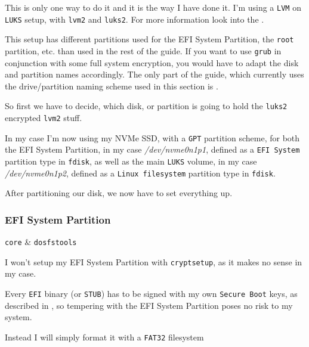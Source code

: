 \documentclass[10pt]{dustdoc}
\begin{document}
\begin{NOTE}
    This is only one way to do it and it is the way I have done it.
    I’m using a \texttt{LVM} on \texttt{LUKS} setup, with \texttt{lvm2} and \texttt{luks2}.
    For more information look into the .
\end{NOTE}

\begin{NOTE}
    This setup has different partitions used for the EFI System Partition, the \texttt{root} partition, etc. than used in the rest of the guide.
    If you want to use \texttt{grub} in conjunction with some full system encryption, you would have to adapt the disk and partition names accordingly.
    The only part of the guide, which currently uses the drive/partition naming scheme used in this section is .
\end{NOTE}

So first we have to decide, which disk, or partition is going to hold the \texttt{luks2} encrypted \texttt{lvm2} stuff.

In my case I’m now using my NVMe SSD, with a \texttt{GPT} partition scheme, for both the EFI System Partition, in my case \textit{/dev/nvme0n1p1}, defined as a \texttt{EFI System} partition type in \texttt{fdisk}, as well as the main \texttt{LUKS} volume, in my case \textit{/dev/nvme0n1p2}, defined as a \texttt{Linux filesystem} partition type in \texttt{fdisk}.

After partitioning our disk, we now have to set everything up.

\subsubsection{EFI System Partition}
\label{sec:efi-system-partition}

\begin{packagetable}
    \texttt{core} & \texttt{dosfstools} \\ 
\end{packagetable}

I won’t setup my EFI System Partition with \texttt{cryptsetup}, as it makes no sense in my case.

Every \texttt{EFI} binary (or \texttt{STUB}) has to be signed with my own \texttt{Secure Boot} keys, as described in , so tempering with the EFI System Partition poses no risk to my system.

Instead I will simply format it with a \texttt{FAT32} filesystem
\end{document}
